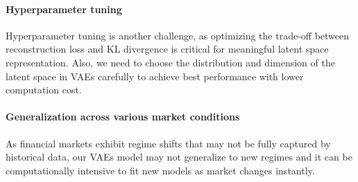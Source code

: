 \documentclass{article}
\begin{document}
\paragraph{Hyperparameter tuning} Hyperparameter tuning is another challenge, as optimizing the trade-off between reconstruction loss and KL divergence is critical for meaningful latent space representation. Also, we need to choose the distribution and dimension of the latent space in VAEs carefully to achieve best performance with lower computation cost.

\paragraph{Generalization across various market conditions}
 As financial markets exhibit regime shifts that may not be fully captured by historical data, our VAEs model may not generalize to new regimes and it can be computationally intensive to fit new models as market changes instantly.




\end{document}
